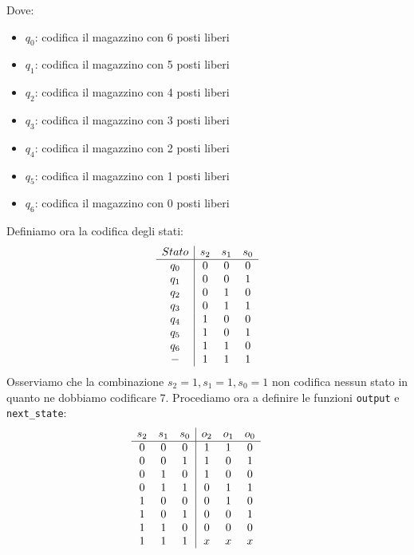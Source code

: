 \documentclass{article}
\begin{document}
\begin{enumerate}
\begin{center}
\begin{tikzpicture}[shorten >=1pt,node distance=2cm,on grid,auto]
    \end{tikzpicture} 
\end{center}
Dove:
\begin{itemize}
    \item $q_0$: codifica il magazzino con 6 posti liberi
    \item $q_1$: codifica il magazzino con 5 posti liberi
    \item $q_2$: codifica il magazzino con 4 posti liberi
    \item $q_3$: codifica il magazzino con 3 posti liberi
    \item $q_4$: codifica il magazzino con 2 posti liberi
    \item $q_5$: codifica il magazzino con 1 posti liberi
    \item $q_6$: codifica il magazzino con 0 posti liberi
\end{itemize}
Definiamo ora la codifica degli stati:
\begin{equation*}
    \begin{array}{c|c c c}
            Stato & s_2 & s_1 & s_0\\
            \hline
            q_0 & 0 & 0 & 0\\
            q_1 & 0 & 0 & 1\\
            q_2 & 0 & 1 & 0\\
            q_3 & 0 & 1 & 1\\
            q_4 & 1 & 0 & 0\\
            q_5 & 1 & 0 & 1\\
            q_6 & 1 & 1 & 0\\
             - & 1 & 1 & 1\\
    \end{array}
\end{equation*}
Osserviamo che la combinazione $s_2=1, s_1=1, s_0=1$ non codifica nessun stato in quanto ne dobbiamo codificare 7.
Procediamo ora a definire le funzioni \texttt{output} e \texttt{next\_state}:
\begin{equation*}
    \begin{array}{c c c c c}
    
        \begin{array}{c c c | c c c}
        s_2 & s_1 & s_0 & o_2 & o_1 & o_0\\
        \hline
            0 & 0 & 0 & 1 & 1 & 0\\
            0 & 0 & 1 & 1 & 0 & 1\\
            0 & 1 & 0 & 1 & 0 & 0\\
            0 & 1 & 1 & 0 & 1 & 1\\
            1 & 0 & 0 & 0 & 1 & 0\\
            1 & 0 & 1 & 0 & 0 & 1\\
            1 & 1 & 0 & 0 & 0 & 0\\
            1 & 1 & 1 & x & x & x\\
        \end{array}
        &      &
        

\end{array}
\end{equation*}
\end{enumerate}
\end{document}
